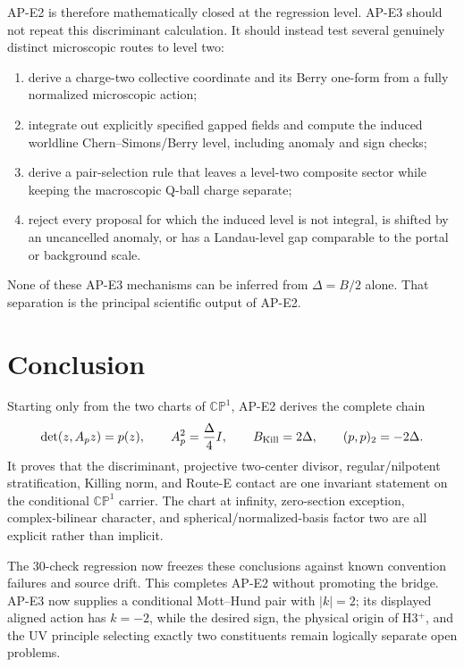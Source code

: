 \documentclass[11pt]{article}
\numberwithin{equation}{section}
\newcommand{\CP}{\mathbb{CP}}
\begin{document}
AP-E2 is therefore mathematically closed at the regression level.  AP-E3
should not repeat this discriminant calculation.  It should instead test
several genuinely distinct microscopic routes to level two:
\begin{enumerate}
\item derive a charge-two collective coordinate and its Berry one-form from a
fully normalized microscopic action;
\item integrate out explicitly specified gapped fields and compute the induced
worldline Chern--Simons/Berry level, including anomaly and sign checks;
\item derive a pair-selection rule that leaves a level-two composite sector
while keeping the macroscopic Q-ball charge separate;
\item reject every proposal for which the induced level is not integral, is
shifted by an uncancelled anomaly, or has a Landau-level gap comparable to the
portal or background scale.
\end{enumerate}
None of these AP-E3 mechanisms can be inferred from
\(\Delta=B/2\) alone.  That separation is the principal scientific output of
AP-E2.

\section{Conclusion}

Starting only from the two charts of \(\CP^1\), AP-E2 derives the complete
chain
\begin{equation}
 \det(z,A_pz)=p(z),
 \qquad
 A_p^2=\frac\Delta4I,
 \qquad
 B_{\rm Kill}=2\Delta,
 \qquad
 (p,p)_2=-2\Delta.
\end{equation}
It proves that the discriminant, projective two-center divisor,
regular/nilpotent stratification, Killing norm, and Route-E contact are one
invariant statement on the conditional \(\CP^1\) carrier.  The chart at
infinity, zero-section exception, complex-bilinear character, and
spherical/normalized-basis factor two are all explicit rather than implicit.

The 30-check regression now freezes these conclusions against known
convention failures and source drift.  This completes AP-E2 without promoting
the bridge.  AP-E3 now supplies a conditional Mott--Hund pair with
\(|k|=2\); its displayed aligned action has \(k=-2\), while the desired sign,
the physical origin of H3$^+$, and the UV principle selecting exactly two
constituents remain logically separate open problems.
\end{document}

